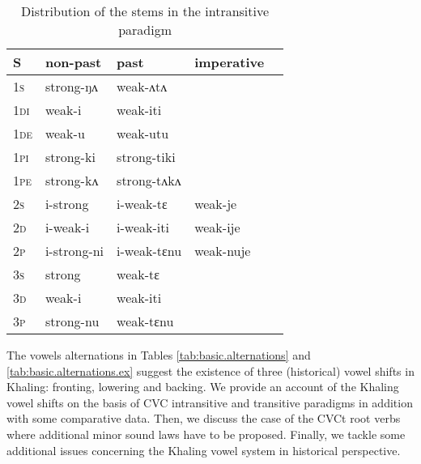 \documentclass[oldfontcommands,oneside,a4paper,11pt]{article}
\newcommand{\ipa}[1]{{\phon \mbox{#1}}} %
\newcommand{\grise}[1]{\cellcolor{lightgray}\textbf{#1}}
\begin{document}
\begin{table}[H]
\caption{Distribution of the stems in the intransitive paradigm } \label{tab:intrans.paradigm} \centering
\begin{tabular}{lllll}
\toprule
S & non-past & past & imperative\\
\midrule
\textsc{1s} & strong-\ipa{ŋʌ} & weak-\ipa{ʌtʌ} \\
\textsc{1di} & weak-\ipa{i} & weak-\ipa{iti} \\
\textsc{1de} & weak-\ipa{u} & weak-\ipa{utu} \\
\textsc{1pi} & strong-\ipa{ki} & strong-\ipa{tiki} \\
\textsc{1pe} & strong-\ipa{kʌ} & strong-\ipa{tʌkʌ} \\
\textsc{2s} & \ipa{i}-strong & \ipa{i}-weak-\ipa{tɛ} \grise{} &weak-\ipa{je}\grise{}\\
\textsc{2d} & \ipa{i}-weak-\ipa{i} & \ipa{i}-weak-\ipa{iti} &weak-\ipa{ije} \\
\textsc{2p} & \ipa{i}-strong-\ipa{ni} & \ipa{i}-weak-\ipa{tɛnu}\grise{} &weak-\ipa{nuje}\grise{}\\
\textsc{3s} & strong & weak-\ipa{tɛ} \grise{}\\
\textsc{3d} & weak-\ipa{i} & weak-\ipa{iti} \\
\textsc{3p} & strong-\ipa{nu} & weak-\ipa{tɛnu}\grise{} \\
\bottomrule
\end{tabular}
\end{table}

The vowels alternations in Tables \ref{tab:basic.alternations} and \ref{tab:basic.alternations.ex} suggest the existence of   three (historical) vowel shifts   in Khaling: fronting, lowering and backing. We provide an account of the Khaling vowel shifts on the basis of CVC intransitive and transitive paradigms in addition with some comparative data. Then, we discuss the case of the CVCt root verbs where additional minor sound laws have to be proposed. Finally, we tackle some additional issues concerning the Khaling vowel system in historical perspective.
\end{document}
